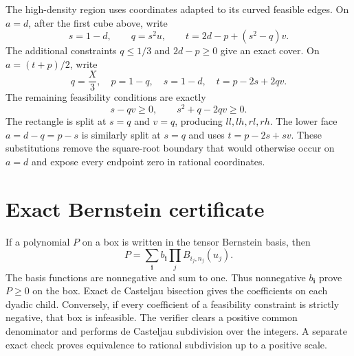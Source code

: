 \documentclass[11pt]{article}
\begin{document}
The high-density region uses coordinates adapted to its curved feasible
edges.  On $a=d$, after the first cube above, write
\begin{equation}
 s=1-d,\qquad q=s^2u,\qquad
 t=2d-p+(s^2-q)v.
 \label{eq:high-upper-d}
\end{equation}
The additional constraints $q\le1/3$ and $2d-p\ge0$ give an exact cover.
On $a=(t+p)/2$, write
\begin{equation}
 q=\frac X3,\quad p=1-q,\quad s=1-d,\quad
 t=p-2s+2qv.
 \label{eq:high-upper-t}
\end{equation}
The remaining feasibility conditions are exactly
\begin{equation}
 s-qv\ge0,\qquad s^2+q-2qv\ge0.
 \label{eq:high-upper-t-constraints}
\end{equation}
The rectangle is split at $s=q$ and $v=q$, producing $ll,lh,rl,rh$.
The lower face $a=d-q=p-s$ is similarly split at $s=q$ and uses
$t=p-2s+sv$.  These substitutions remove the square-root boundary that
would otherwise occur on $a=d$ and expose every endpoint zero in rational
coordinates.

\section{Exact Bernstein certificate}

If a polynomial $P$ on a box is written in the tensor Bernstein basis, then
\[
 P=\sum_{\boldsymbol i}b_{\boldsymbol i}
 \prod_j B_{i_j,n_j}(u_j).
\]
The basis functions are nonnegative and sum to one.  Thus nonnegative
$b_{\boldsymbol i}$ prove $P\ge0$ on the box.  Exact de Casteljau bisection
gives the coefficients on each dyadic child.  Conversely, if every
coefficient of a feasibility constraint is strictly negative, that box is
infeasible.  The verifier clears a positive common denominator and performs
de Casteljau subdivision over the integers.  A separate exact check proves
equivalence to rational subdivision up to a positive scale.
\end{document}
